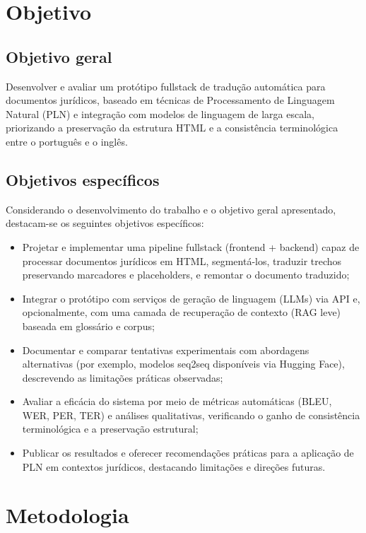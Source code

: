 \section{Objetivo}

\subsection{Objetivo geral}

Desenvolver e avaliar um protótipo fullstack de tradução automática para documentos jurídicos, baseado em técnicas de Processamento de Linguagem Natural (PLN) e integração com modelos de linguagem de larga escala, priorizando a preservação da estrutura HTML e a consistência terminológica entre o português e o inglês.

\subsection{Objetivos específicos}

Considerando o desenvolvimento do trabalho e o objetivo geral apresentado, destacam-se os seguintes objetivos específicos:

\begin{itemize}
    \item Projetar e implementar uma pipeline fullstack (frontend + backend) capaz de processar documentos jurídicos em HTML, segmentá-los, traduzir trechos preservando marcadores e placeholders, e remontar o documento traduzido;
    \item Integrar o protótipo com serviços de geração de linguagem (LLMs) via API e, opcionalmente, com uma camada de recuperação de contexto (RAG leve) baseada em glossário e corpus;
    \item Documentar e comparar tentativas experimentais com abordagens alternativas (por exemplo, modelos seq2seq disponíveis via Hugging Face), descrevendo as limitações práticas observadas;
    \item Avaliar a eficácia do sistema por meio de métricas automáticas (BLEU, WER, PER, TER) e análises qualitativas, verificando o ganho de consistência terminológica e a preservação estrutural;
    \item Publicar os resultados e oferecer recomendações práticas para a aplicação de PLN em contextos jurídicos, destacando limitações e direções futuras.
\end{itemize}

\section{Metodologia}

